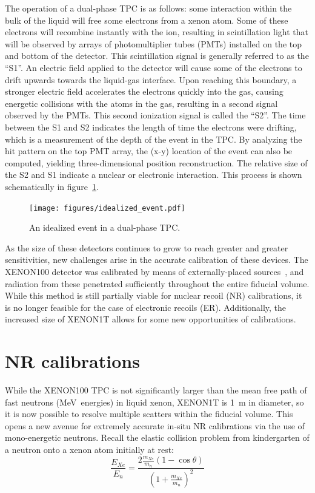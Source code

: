 \documentclass[phys,dissertation]{puthesis}
\begin{document}
The operation of a dual-phase TPC is as follows: some interaction within the bulk of the liquid will free some electrons from a xenon atom. Some of these electrons will recombine instantly with the ion, resulting in scintillation light that will be observed by arrays of photomultiplier tubes (PMTs) installed on the top and bottom of the detector. This scintillation signal is generally referred to as the ``S1''. An electric field applied to the detector will cause some of the electrons to drift upwards towards the liquid-gas interface. Upon reaching this boundary, a stronger electric field accelerates the electrons quickly into the gas, causing energetic collisions with the atoms in the gas, resulting in a second signal observed by the PMTs. This second ionization signal is called the ``S2''. The time between the S1 and S2 indicates the length of time the electrons were drifting, which is a measurement of the depth of the event in the TPC. By analyzing the hit pattern on the top PMT array, the (x-y) location of the event can also be computed, yielding three-dimensional position reconstruction. The relative size of the S2 and S1 indicate a nuclear or electronic interaction. This process is shown schematically in figure~\ref{fig:tpcevent}.

\begin{figure}[htb]
\centering
\texttt{[image: figures/idealized\_event.pdf]}
\caption{An idealized event in a dual-phase TPC.}
\label{fig:tpcevent}
\end{figure}

As the size of these detectors continues to grow to reach greater and greater sensitivities, new challenges arise in the accurate calibration of these devices. The XENON100 detector was calibrated by means of externally-placed sources~\cite{XENON100Collaboration2011}, and radiation from these penetrated sufficiently throughout the entire fiducial volume. While this method is still partially viable for nuclear recoil (NR) calibrations, it is no longer feasible for the case of electronic recoils (ER). Additionally, the increased size of XENON1T allows for some new opportunities of calibrations.

\section{NR calibrations}

While the XENON100 TPC is not significantly larger than the mean free path of fast neutrons (MeV~energies) in liquid xenon, XENON1T is 1~m in diameter, so it is now possible to resolve multiple scatters within the fiducial volume. This opens a new avenue for extremely accurate in-situ NR calibrations via the use of mono-energetic neutrons. Recall the elastic collision problem from kindergarten of a neutron onto a xenon atom initially at rest:
\begin{equation}
\frac{E_{Xe}}{E_n} = \frac{2\frac{m_{Xe}}{m_n}(1-\cos\theta)}{\left(1+\frac{m_{Xe}}{m_n}\right)^2}
\label{eq:collision}
\end{equation}
\end{document}
